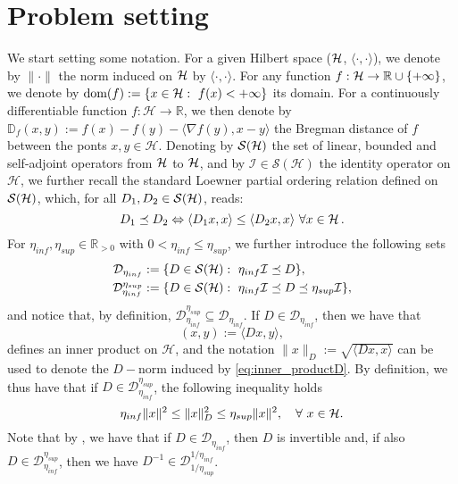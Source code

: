 \documentclass[conference]{IEEEtran}
\begin{document}
\section{Problem setting}
We start setting some notation. For a given Hilbert space ($\mathcal H$, $\langle \cdot, \cdot\rangle$), we denote by $\|\cdot\|$ the norm induced on $\mathcal H$ by $\langle \cdot, \cdot\rangle$. For any function $f:\mathcal{H}\rightarrow \mathbb R\cup\{+\infty\}$, we denote by $\mbox{dom}(f):=\{{x}\in\mathcal H: \ f({x})< + \infty\}$ its domain.  For a continuously differentiable function $f:\mathcal{H}\rightarrow \mathbb{R}$, we then denote by $\mathbb{D}_f(x,y):=f(x)-f(y)-\langle \nabla f(y),x-y\rangle$ the Bregman distance of $f$ between the ponts $x, y\in\mathcal{H}$.
Denoting by $\mathcal{S}(\mathcal H)$ the set of linear, bounded and self-adjoint operators from $\mathcal H$ to $\mathcal H$, and by $\mathcal{I}\in \mathcal{S}(\mathcal{H})$ the identity operator on $\mathcal{H}$, we further recall the standard Loewner partial ordering relation defined  on $\mathcal{S}(\mathcal H)$, which,  for all $ D_1, D_2 \in \mathcal{S}(\mathcal H)$, reads:
$$
 D_1\preceq D_2 \Leftrightarrow \langle D_1 x, x \rangle \leq \langle D_2 x, x \rangle  \ \forall x \in \mathcal H \, .
$$
For $\eta_{inf},\eta_{sup}\in\mathbb{R}_{>0}
$ with $0<\eta_{inf}\leq \eta_{sup}$, we further introduce the following sets
\begin{align*}
\mathcal{D}_{\eta_{inf}}&:=\{D\in \mathcal{S}(\H): \ \eta_{inf} \mathcal{I} \preceq D \},\\
\mathcal{D}_{\eta_{inf}}^{\eta_{sup}}&:=\{D\in \mathcal{S}(\H): \ \eta_{inf} \mathcal{I} \preceq D \preceq \eta_{sup} \mathcal{I} \},
\end{align*}
and notice that, by definition, $\mathcal{D}_{\eta_{inf}}^{\eta_{sup}}\subseteq \mathcal{D}_{\eta_{inf}}$. If $D\in \mathcal{D}_{\eta_{inf}}$, then we have that
\begin{equation}\label{eq:inner_productD}
(x,y):=\langle Dx, y \rangle,
\end{equation}
defines an inner product on $\mathcal{H}$, and the notation $\|x\|_D:=\sqrt{\langle Dx, x\rangle}$ can be used to denote the $D-$norm induced by \eqref{eq:inner_productD}. By definition, we thus have that if $D\in \mathcal{D}_{\eta_{inf}}^{\eta_{sup}}$, the following inequality holds
\begin{equation}\label{ine_norm}
\eta_{inf} \| x\|^2 \leq  \|x\|_D^2 \leq \eta_{sup} \| x \|^2, \quad \forall \ x\in\mathcal H.
\end{equation}
Note that by \cite[Theorem 4.6.11]{Debnath-etal-1990}, we have that if $D\in\mathcal{D}_{\eta_{inf}}$, then $D$ is invertible and, if also $D\in\mathcal{D}_{\eta_{inf}}^{\eta_{sup}}$, then we have $D^{-1}\in\mathcal{D}_{1/\eta_{sup}}^{1/\eta_{inf}}$. 
\end{document}
